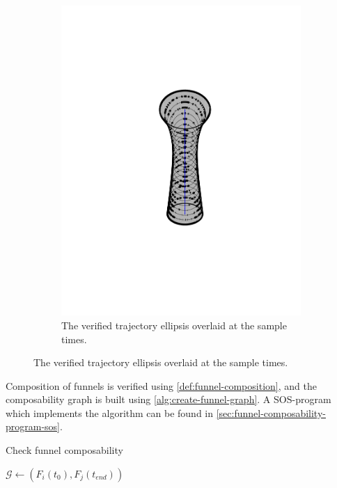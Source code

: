 \begin{figure}
\begin{subfigure}[b]{0.5\textwidth}
    \includegraphics[trim={5cm 5cm 5cm 5cm},
    width=\textwidth]{figures/method/funnel-sampled}
    \caption{The verified trajectory ellipsis overlaid at the sample times.}
    \label{fig:funnel-straight-sampled}
  \end{subfigure}
\end{figure}

Composition of funnels is verified using \cref{def:funnel-composition}, and the
composability graph is built using \cref{alg:create-funnel-graph}. A
\ac{SOS}-program which implements the algorithm can be found in
\cref{sec:funnel-composability-program-sos}.

\begin{algorithm}
  \caption{Check funnel composability}
  \label{alg:create-funnel-graph}
  \DontPrintSemicolon \SetAlgoNoLine


  {  { %
      { \(\mathcal{G} \leftarrow{} \left( F_{i}(t_{0}), F_{j}(t_{end})
        \right)\)%
      }%
    }%
  }
\end{algorithm}

